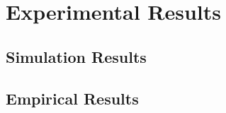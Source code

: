 \chapter{Experimental Results}
\label{chapter3}

\section{Simulation Results}
\label{sec:chapter3:simulation}

\section{Empirical Results}
\label{sec:chapter3:empirical}
